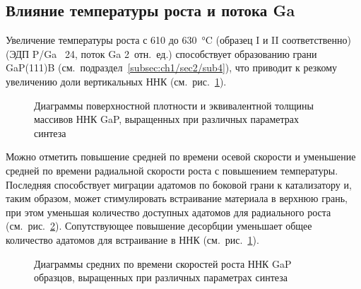 \subsection{Влияние температуры роста и потока Ga}\label{subsec:ch6/sec2/sub3}

Увеличение температуры роста с 610 до 630~\si{\degreeCelsius} (образец I и II
соответственно) (ЭДП P/Ga ~24, поток Ga 2~отн.~ед.) способствует образованию
грани GaP(111)B (см.~подраздел~\cref{subsec:ch1/sec2/sub4}), что приводит к
резкому увеличению доли вертикальных ННК (см.~рис.~\cref{fig:Image_42_1}).

\begin{figure}[ht]  
\caption{Диаграммы поверхностной плотности и эквивалентной толщины массивов ННК
GaP, выращенных при различных параметрах синтеза}\label{fig:Image_42_1}
\end{figure}

Можно отметить повышение средней по времени осевой скорости и уменьшение
средней по времени радиальной скорости роста с повышением температуры.
Последняя способствует миграции адатомов по боковой грани к катализатору и,
таким образом, может стимулировать встраивание материала в верхнюю грань, при
этом уменьшая количество доступных адатомов для радиального роста
(см.~рис.~\cref{fig:Image_42_2}). Сопутствующее повышение десорбции уменьшает
общее количество адатомов для встраивание в ННК
(см.~рис.~\cref{fig:Image_42_1}).

\begin{figure}[ht]   \caption{Диаграммы
средних по времени скоростей роста ННК GaP образцов, выращенных при различных
параметрах синтеза}\label{fig:Image_42_2} \end{figure}

